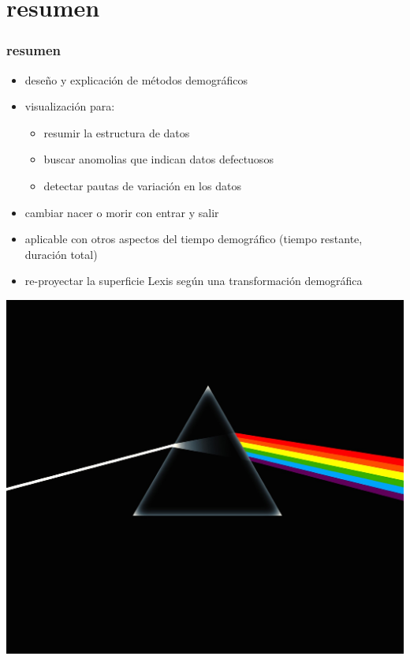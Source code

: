 \documentclass[20pt]{beamer}
\begin{document}
\section{resumen}
\begin{frame}
\frametitle{resumen}
\begin{itemize}[<+->]
  \item dese\~{n}o y explicaci\'{o}n de m\'{e}todos demogr\'{a}ficos
  \item visualizaci\'{o}n para:
  \begin{itemize}
    \item resumir la estructura de datos
    \item buscar anomolias que indican datos defectuosos
    \item detectar pautas de variaci\'{o}n en los datos
  \end{itemize}
  \item cambiar nacer o morir con entrar y salir
  \item aplicable con otros aspectos del tiempo demogr\'{a}fico (tiempo restante,
  duraci\'{o}n total)
  \item re-proyectar la superficie Lexis seg\'{u}n una transformaci\'{o}n demogr\'{a}fica
\end{itemize}
\end{frame}

\begin{frame}
\vspace{-15em}
\begin{center}
\hspace*{-6cm}\includegraphics[scale=.7]{Figures/prism.jpg}
\end{center}
\end{frame}
\end{document}
